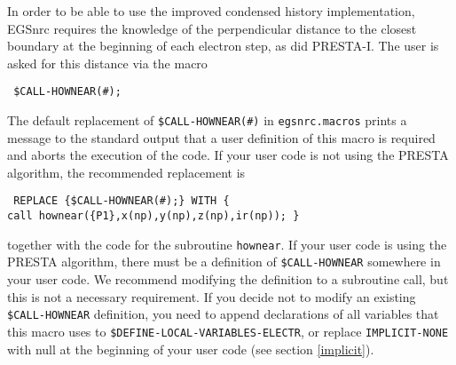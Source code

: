 In order to be able to use the improved 
condensed history implementation, EGSnrc 
requires the knowledge of the perpendicular distance 
to the closest boundary at the beginning of each electron 
step, as did PRESTA-I. The user is asked for this distance via the macro 
\begin{flushleft}{\tt
\$CALL-HOWNEAR(\#); }
\end{flushleft}
The default replacement of {\tt \$CALL-HOWNEAR(\#)} in 
{\tt egsnrc.macros} prints a message to the standard output 
that a user definition of this macro is required and aborts 
the execution of the code. If your user code is not using 
the PRESTA algorithm, the recommended 
replacement is 
\begin{flushleft}{\tt
REPLACE \{\$CALL-HOWNEAR(\#);\} WITH \{ \\
\quad call hownear(\{P1\},x(np),y(np),z(np),ir(np)); \} }
\end{flushleft}
together with the code for the subroutine {\tt hownear}. 
If your user code is using the PRESTA algorithm, there must 
be a definition of {\tt \$CALL-HOWNEAR} somewhere in 
your user code. We recommend modifying the definition 
to a subroutine call, but this is not a necessary 
requirement. If you decide not to modify an existing 
{\tt \$CALL-HOWNEAR} definition, you need to append 
declarations of all variables that this macro uses 
to {\tt \$DEFINE-LOCAL-VARIABLES-ELECTR}, or replace 
{\tt IMPLICIT-NONE} with null at the beginning of 
your user code (see section \ref{implicit}). 

